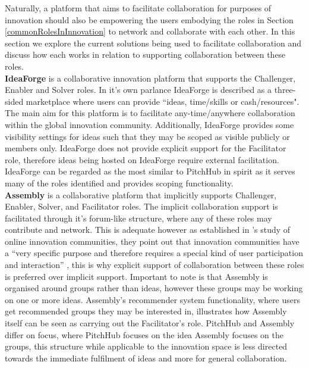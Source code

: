 Naturally, a platform that aims to facilitate collaboration for purposes of innovation should also be empowering the users embodying the roles in Section \ref{commonRolesInInnovation} to network and collaborate with each other. In this section we explore the current solutions being used to facilitate collaboration and discuss how each works in relation to supporting collaboration between these roles.
\\
\newline
\textbf{IdeaForge} \cite{ideaForge:online}
is a collaborative innovation platform that supports the Challenger, Enabler and Solver roles. In it's own parlance IdeaForge is described as a three-sided marketplace where users can provide ``ideas, time/skills or cash/resources". The main aim for this platform is to facilitate any-time/anywhere collaboration within the global innovation community. Additionally, IdeaForge provides some visibility settings for ideas such that they may be scoped as visible publicly or members only. IdeaForge does not provide explicit support for the Facilitator role, therefore ideas being hosted on IdeaForge require external facilitation. IdeaForge can be regarded as the most similar to PitchHub in spirit as it serves many of the roles identified and provides scoping functionality.
\\
\newline
\textbf{Assembly} \cite{assembly:online}
is a collaborative platform that implicitly supports Challenger, Enabler, Solver, and Facilitator roles. The implicit collaboration support is facilitated through it's forum-like structure, where any of these roles may contribute and network. This is adequate however as established in \citeauthor{hautz2010establish}'s study of online innovation communities, they point out that innovation communities have a ``very specific purpose and therefore requires a special kind of user participation and interaction'' \cite{hautz2010establish}, this is why explicit support of collaboration between these roles is preferred over implicit support. Important to note is that Assembly is organised around groups rather than ideas, however these groups may be working on one or more ideas. Assembly's recommender system functionality, where users get recommended groups they may be interested in, illustrates how Assembly itself can be seen as carrying out the Facilitator's role. PitchHub and Assembly differ on focus, where PitchHub focuses on the idea Assembly focuses on the groups, this structure while applicable to the innovation space is less directed towards the immediate fulfilment of ideas and more for general collaboration.
